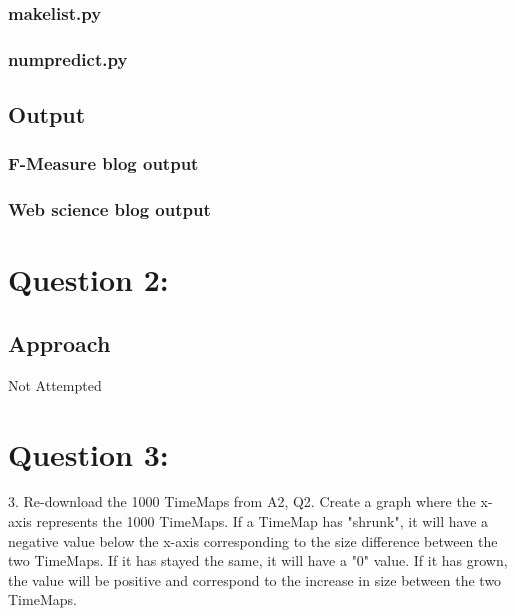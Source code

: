 \documentclass[12pt]{article}
\begin{document}
\subsubsection{makelist.py}


\subsubsection{numpredict.py}





\newpage


\subsection{Output}


\subsubsection{F-Measure blog output}

\subsubsection{Web science blog output}




\newpage

\section{Question 2: }
\subsection{Approach}
Not Attempted
\newpage
\section{Question 3: }
3. Re-download the 1000 TimeMaps from A2, Q2.  Create a graph where
the x-axis represents the 1000 TimeMaps.  If a TimeMap has "shrunk",
it will have a negative value below the x-axis corresponding to the
size difference between the two TimeMaps.  If it has stayed the
same, it will have a "0" value.  If it has grown, the value will be 
positive and correspond to the increase in size between the two
TimeMaps.
\end{document}
